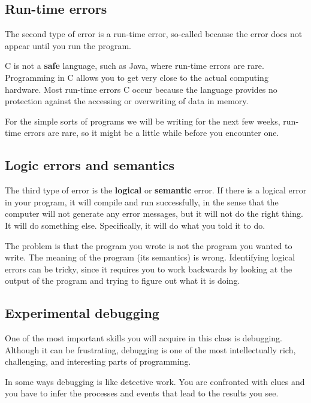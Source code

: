 \subsection{Run-time errors}
\label{run-time}

The second type of error is a run-time error, so-called because
the error does not appear until you run the program.  

C is not a {\bf safe} language, such as Java, where
run-time errors are rare. Programming in C allows you to get very close to the actual
computing hardware. Most run-time errors C occur because the
language provides no protection against the accessing or
overwriting of data in memory.

For the simple sorts of programs we will be writing for the next few weeks, 
run-time errors are rare, so it might be a little while before you encounter one.


\subsection{Logic errors and semantics}

The third type of error is the {\bf logical} or {\bf semantic}
error.  If there is a logical error in your program, it will
compile and run successfully, in the sense that the computer
will not generate any error messages, but it will not do the
right thing.  It will do something else.  Specifically, it will
do what you told it to do.

The problem is that the program you wrote is not the program
you wanted to write.  The meaning of the program (its semantics)
is wrong.  Identifying logical errors can be tricky, since
it requires you to work backwards by looking at the output
of the program and trying to figure out what it is doing.

\subsection{Experimental debugging}

One of the most important skills you will acquire in this
class is debugging.  Although it can be frustrating, debugging
is one of the most intellectually rich, challenging, and
interesting parts of programming.

In some ways debugging is like detective work.  You are
confronted with clues and you have to infer the processes
and events that lead to the results you see.


